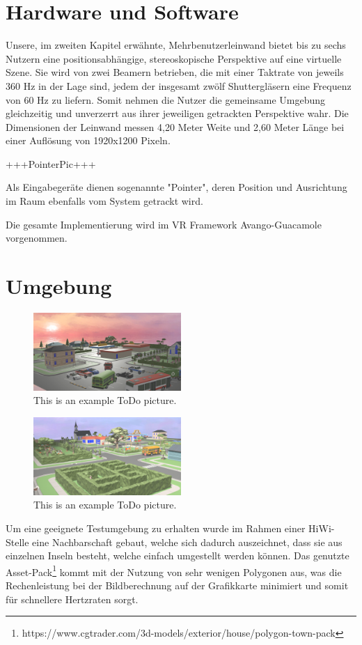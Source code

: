 \section{Hardware und Software}
Unsere, im zweiten Kapitel erwähnte, Mehrbenutzerleinwand bietet bis zu sechs Nutzern eine positionsabhängige, stereoskopische Perspektive auf eine virtuelle Szene. Sie wird von zwei Beamern betrieben, die mit einer Taktrate von jeweils 360 Hz in der Lage sind, jedem der insgesamt zwölf Shuttergläsern eine Frequenz von 60 Hz zu liefern. Somit nehmen die Nutzer die gemeinsame Umgebung gleichzeitig und unverzerrt aus ihrer jeweiligen getrackten Perspektive wahr. Die Dimensionen der Leinwand messen 4,20 Meter Weite und 2,60 Meter Länge bei einer Auflösung von 1920x1200 Pixeln.

+++PointerPic+++

Als Eingabegeräte dienen sogenannte "Pointer", deren Position und Ausrichtung im Raum ebenfalls vom System getrackt wird.

Die gesamte Implementierung wird im VR Framework Avango-Guacamole \cite{Schneegans2014Guacamole-AnShading} vorgenommen.

\section{Umgebung}

\begin{figure}[]
  \centering
  \includegraphics[width=0.5\textwidth]{images/map1.png}
  \caption{This is an example ToDo picture.}
  \label{fig:todo}
\end{figure}


\begin{figure}[]
  \centering
  \includegraphics[width=0.5\textwidth]{images/map2.png}
  \caption{This is an example ToDo picture.}
  \label{fig:todo}
\end{figure}

Um eine geeignete Testumgebung zu erhalten wurde im Rahmen einer HiWi-Stelle eine Nachbarschaft gebaut, welche sich dadurch auszeichnet, dass sie aus einzelnen \glqq Inseln \grqq{} besteht, welche einfach umgestellt werden können. Das genutzte Asset-Pack\footnote{https://www.cgtrader.com/3d-models/exterior/house/polygon-town-pack} kommt mit der Nutzung von sehr wenigen Polygonen aus, was die Rechenleistung bei der Bildberechnung auf der Grafikkarte minimiert und somit für schnellere Hertzraten sorgt.